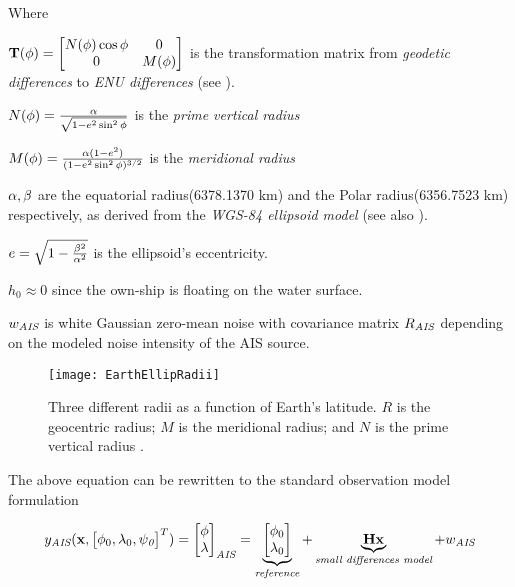Where

\begin{description}
	\item $\mathbf{T}({\phi})=
	\begin{bmatrix}
	N({\phi})\cos{\phi} &0\\
	0 &M({\phi})
	\end{bmatrix}
	$ is the transformation matrix from \emph{geodetic differences} to \emph{ENU differences} (see ).
	\item $N({\phi}) = \frac{{\alpha}}{\sqrt{1-e^2\sin^2{\phi}}}$ is the \emph{prime vertical radius}
	\item $M({\phi}) = \frac{{\alpha}(1-e^2)}{(1-e^2\sin^2{\phi})^{3/2}}$ is the \emph{meridional radius}
	\item ${\alpha},{\beta}$ are the equatorial radius(6378.1370 km) and the Polar radius(6356.7523 km) respectively, as derived from the \emph{WGS-84 ellipsoid model} \cite{Farrell2008} (see also ).
	\item $e = \sqrt{1 -\frac{{\beta}^2}{{\alpha}^2}}$ is the ellipsoid's eccentricity.
	\item $h _0 \approx 0 $ since the own-ship is floating on the water surface.
	\item ${w}_{\textit{AIS}}$ is white Gaussian zero-mean noise with covariance matrix ${R}_{\textit{AIS}}$ depending on the modeled noise intensity of the AIS source.
\end{description}

\begin{figure}
	\centering
	\texttt{[image: EarthEllipRadii]}
	\caption{Three different radii as a function of Earth's latitude. $R$ is the geocentric radius; $M$ is the meridional radius; and $N$ is the prime vertical radius \cite{nima2000}.}
	\label{fig:earthellipradii}
\end{figure}


The above equation can be rewritten to the standard observation model formulation

\begin{equation}
{{y}}_{\textit{AIS}}(\mathbf{x},\begin{bmatrix}{\phi}_{0}, {\lambda}_{0}, {\psi}_{\textit{0}} \end{bmatrix}^{T}) = \begin{bmatrix}
{\phi}\\ {\lambda}
\end{bmatrix}_{\textit{AIS}} = \underbrace{\begin{bmatrix}
{\phi}_{0}\\ {\lambda}_{0}
\end{bmatrix}}_{\textit{reference}} + \underbrace{\mathbf{H}\mathbf{x} }_{\textit{small differences model}} + {w}_{\textit{AIS}}
\end{equation}

